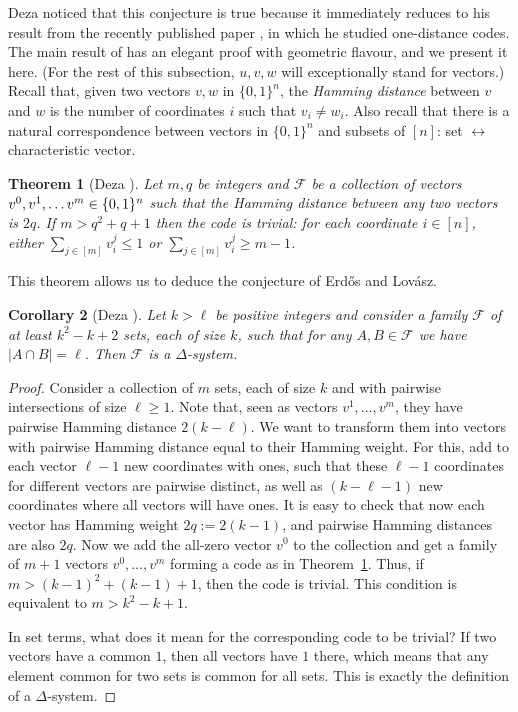 \documentclass[graybox]{svmult}
\renewcommand{\le}{\leqslant}
\renewcommand{\ge}{\geqslant}
\newcommand{\ff}{\mathcal{F}}
\newcommand{\m}{\mathcal}
\newtheorem{thm}{Theorem}
\newtheorem{cor}[thm]{Corollary}
\begin{document}
Deza \cite{D1} noticed that this conjecture is true because it immediately reduces to his result from the recently published paper \cite{D0}, in which he studied one-distance codes. The main result of \cite{D0} has an elegant proof with geometric flavour, and we present it here. (For the rest of this subsection, $u,v,w$ will exceptionally stand for vectors.) Recall that, given two vectors $v,w$ in $\{0,1\}^n$, the {\it Hamming distance} between $v$ and $w$ is the number of coordinates $i$ such that $v_i\ne w_i$. Also recall that there is a natural correspondence between vectors in $\{0,1\}^n$ and subsets of $[n]$: set $\leftrightarrow$ characteristic vector.

\begin{thm}[Deza \cite{D0}]\label{thmde} Let $m,q$ be integers and  $\mathcal F$ be a collection of vectors $v^0,v^1,\ldots v^m\in \m \{0,1\}^n$ such that the Hamming distance between any two vectors is $2q$. If $m>q^2+q+1$ then the code is {\em trivial}: for each coordinate $i\in[n]$, either $\sum_{j\in[m]} v_i^j\le 1$ or $\sum_{j\in[m]} v_i^j\ge m-1$.
\end{thm}

This theorem allows us to deduce the conjecture of Erd\H os and Lov\'asz.

\begin{cor}[Deza \cite{D1}]\label{corde} Let $k> \ell$ be positive integers and consider a family $\ff$ of at least $k^2-k+2$ sets, each of size $k$, such that for any $A,B\in \ff$ we have $|A\cap B|=\ell$. Then $\ff$ is a $\Delta$-system.
\end{cor}
\begin{proof} Consider a collection of $m$ sets, each of size $k$ and with pairwise intersections of size $\ell\ge 1$. Note that, seen as vectors $v^1,\ldots, v^{m}$, they have pairwise Hamming distance $2(k-\ell)$. %
 We want to transform them into vectors with pairwise Hamming distance equal to their Hamming weight. For this, add to each vector $\ell-1$ new coordinates with ones, such that these $\ell-1$ coordinates for different vectors are pairwise distinct, as well as $(k-\ell-1)$ new coordinates where all vectors will have ones. It is easy to check that now each vector has Hamming weight $2q := 2(k-1)$, and pairwise Hamming distances are also $2q$. Now we add the all-zero vector $v^0$ to the collection and get a family of $m+1$ vectors $v^0,\ldots, v^m$ forming a code as in Theorem~\ref{thmde}. Thus, if $m>(k-1)^2+(k-1)+1$, then the code is trivial. This condition is equivalent to $m>k^2-k+1$.

In set terms, what does it mean for the corresponding code to be trivial? If two vectors have a common $1$, then all vectors have $1$ there, which means that any element common for two sets is common for all sets. This is exactly the definition of a $\Delta$-system.
\end{proof}
\end{document}
